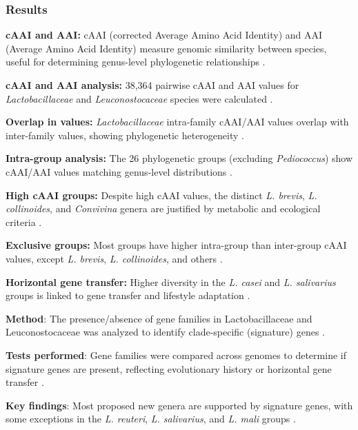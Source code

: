 \subsubsection{Results}
\textbf{cAAI and AAI:} cAAI (corrected Average Amino Acid Identity) and AAI (Average Amino Acid Identity) measure genomic similarity between species, useful for determining genus-level phylogenetic relationships \cite*{L3-TaxNotes}.

\clearpage %

\textbf{cAAI and AAI analysis:} 38,364 pairwise cAAI and AAI values for \textit{Lactobacillaceae} and \textit{Leuconostocaceae} species were calculated \cite*{L3-TaxNotes}.

\textbf{Overlap in values:} \textit{Lactobacillaceae} intra-family cAAI/AAI values overlap with inter-family values, showing phylogenetic heterogeneity \cite*{L3-TaxNotes}.

\textbf{Intra-group analysis:} The 26 phylogenetic groups (excluding \textit{Pediococcus}) show cAAI/AAI values matching genus-level distributions \cite*{L3-TaxNotes}.

\textbf{High cAAI groups:} Despite high cAAI values, the distinct \textit{L. brevis}, \textit{L. collinoides}, and \textit{Convivina} genera are justified by metabolic and ecological criteria \cite*{L3-TaxNotes}.

\textbf{Exclusive groups:} Most groups have higher intra-group than inter-group cAAI values, except \textit{L. brevis}, \textit{L. collinoides}, and others \cite*{L3-TaxNotes}.

\textbf{Horizontal gene transfer:} Higher diversity in the \textit{L. casei} and \textit{L. salivarius} groups is linked to gene transfer and lifestyle adaptation \cite*{L3-TaxNotes}.

\textbf{Method}: The presence/absence of gene families in Lactobacillaceae and Leuconostocaceae was analyzed to identify clade-specific (signature) genes \cite*{L3-TaxNotes}.

\textbf{Tests performed}: Gene families were compared across genomes to determine if signature genes are present, reflecting evolutionary history or horizontal gene transfer \cite*{L3-TaxNotes}.

\textbf{Key findings}: Most proposed new genera are supported by signature genes, with some exceptions in the \textit{L. reuteri}, \textit{L. salivarius}, and \textit{L. mali} groups \cite*{L3-TaxNotes}.

